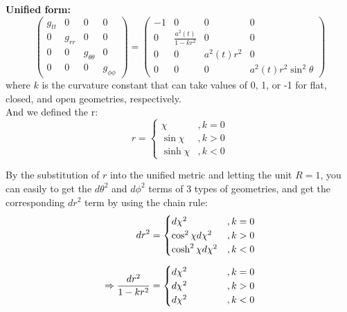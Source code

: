 \bigskip\noindent
\begin{theory}
    \textbf{Unified form:} \\
    \begin{equation*}
        \begin{pmatrix}
            g_{tt} & 0 & 0 & 0 \\
            0 & g_{rr} & 0 & 0 \\
            0 & 0 & g_{\theta\theta} & 0 \\
            0 & 0 & 0 & g_{\phi\phi}
        \end{pmatrix}
        =
        \begin{pmatrix}
            -1 & 0 & 0 & 0 \\
            0 & \frac{a^2(t)}{1 - kr^2} & 0 & 0 \\
            0 & 0 & a^2(t) r^2 & 0 \\
            0 & 0 & 0 & a^2(t) r^2 \sin^2\theta
        \end{pmatrix}
    \end{equation*}
    where $k$ is the curvature constant that can take values of 0, 1, or -1 for flat, closed, and open geometries, respectively. \\
    And we defined the r: \\
    \[
        r = \begin{cases}
            \chi & ,k = 0 \\
            \sin\chi & ,k > 0 \\
            \sinh\chi & ,k < 0
        \end{cases}
    \]
\end{theory}

\bigskip\noindent
\begin{foundation}
    By the substitution of $r$ into the unified metric and letting the unit $R = 1$, you can easily to get the $d\theta^2$ and $d\phi^2$ terms of 3 types of geometries, and get the corresponding $dr^2$ term by using the chain rule: \\
    \begin{align*}
        dr^2 &= \begin{cases}
            d\chi^2 & ,k = 0 \\
            \cos^2\chi d\chi^2 & ,k > 0 \\
            \cosh^2\chi d\chi^2 & ,k < 0
        \end{cases} \\[0.5em]
        \Rightarrow \frac{dr^2}{1 - kr^2} &= \begin{cases}
            d\chi^2 \hphantom{\cosh^2\chi} & ,k = 0 \\
            d\chi^2 \hphantom{\cosh^2\chi} & ,k > 0 \\
            d\chi^2 \hphantom{\cosh^2\chi} & ,k < 0
        \end{cases}
    \end{align*}
\end{foundation}

